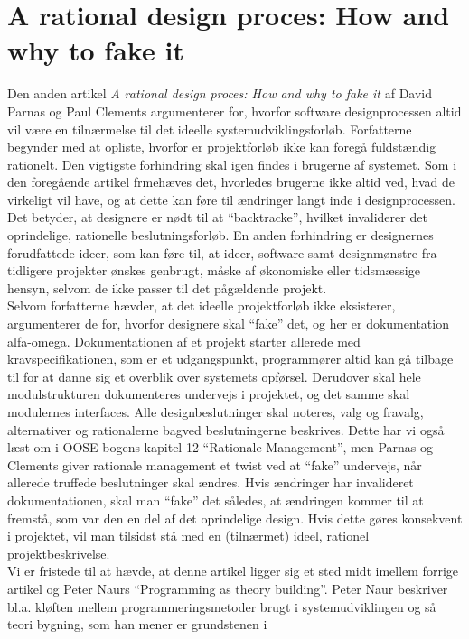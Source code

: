 \documentclass[12pt]{article}   %
\begin{document}
\section{A rational design proces: How and why to fake it}
Den anden artikel \emph{A rational design proces: How and why to fake it} af
David Parnas og Paul Clements argumenterer for, hvorfor software designprocessen
altid vil være en tilnærmelse til det ideelle systemudviklingsforløb. Forfatterne
begynder med at opliste, hvorfor er projektforløb ikke kan foregå fuldstændig
rationelt. Den vigtigste forhindring skal igen findes i brugerne af systemet. Som
i den foregående artikel frmehæves det, hvorledes brugerne ikke altid ved, hvad
de virkeligt vil have, og at dette kan føre til ændringer langt inde i
designprocessen. Det betyder, at designere er nødt til at ``backtracke'',
hvilket invaliderer det oprindelige, rationelle beslutningsforløb. En anden
forhindring er designernes forudfattede ideer, som kan føre til, at ideer,
software samt designmønstre fra tidligere projekter ønskes genbrugt, måske af
økonomiske eller tidsmæssige hensyn, selvom de ikke passer til det pågældende
projekt. \\
Selvom forfatterne hævder, at det ideelle projektforløb ikke eksisterer,
argumenterer de for, hvorfor designere skal ``fake'' det, og her er
dokumentation alfa-omega. Dokumentationen af et projekt starter allerede med
kravspecifikationen, som er et udgangspunkt, programmører altid kan gå tilbage
til for at danne sig et overblik over systemets opførsel. Derudover skal hele
modulstrukturen dokumenteres undervejs i projektet, og det samme skal modulernes 
interfaces. Alle designbeslutninger skal noteres, valg og fravalg,
alternativer og rationalerne bagved beslutningerne beskrives. Dette har vi 
også læst om i OOSE bogens kapitel 12 ``Rationale Management'', men Parnas og
Clements giver rationale management et twist ved at ``fake'' undervejs, når
allerede truffede beslutninger skal ændres. Hvis ændringer har invalideret
dokumentationen, skal man ``fake'' det således, at ændringen kommer til at
fremstå, som var den en del af det oprindelige design. Hvis dette gøres
konsekvent i projektet, vil man tilsidst stå med en (tilnærmet) ideel,
rationel projektbeskrivelse. \\
Vi er fristede til at hævde, at denne artikel ligger sig et sted midt imellem
forrige artikel og Peter Naurs ``Programming as theory building''. Peter Naur
beskriver bl.a. kløften mellem programmeringsmetoder brugt i
systemudviklingen og så teori bygning, som han mener er grundstenen i
\end{document}
